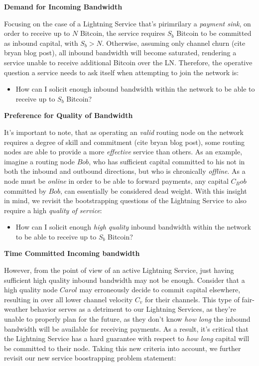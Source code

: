 \documentclass[12pt,a4paper]{article}
\theoremstyle{definition}
\begin{document}
\begin{center}
	\textbf{Demand for Incoming Bandwidth}
\end{center}

Focusing on the case of a Lightning Service that's pirimrilary a \emph{payment
sink}, on order to receive up to $N$ Bitcoin, the service requires $S_b$
Bitcoin to be committed as inbound capital, with $S_b > N$. Otherwise, assuming
only channel churn (cite bryan blog post), all inbound bandwidth will become
saturated, rendering a service unable to receive additional Bitcoin over the
LN. Therefore, the operative question a service needs to ask itself when
attempting to join the network is:

\begin{itemize}
        \item How can I solicit enough inbound bandwidth within the network to
            be able to receive up to $S_b$ Bitcoin?
\end{itemize}


\begin{center}
	\textbf{Preference for Quality of Bandwidth}
\end{center}

It's important to note, that as operating an \emph{valid} routing node on the
network requires a degree of skill and commitment (cite bryan blog post), some
routing nodes are able to provide a more \emph{effective} service than others.
As an example, imagine a routing node $Bob$, who has sufficient capital
committed to his not in both the inbound and outbound directions, but who is
chronically \emph{offline}. As a node must be \emph{online} in order to be able
to forward payments, any capital $C_Bob$ committed by $Bob$, can essentially be
considered dead weight. With this insight in mind, we revisit the bootstrapping
questions of the Lightning Service to also require a high \emph{quality of
service}:

\begin{itemize}
        \item How can I solicit enough \emph{high quality} inbound bandwidth
            within the network to be able to receive up to $S_b$ Bitcoin?
\end{itemize}

\begin{center}
	\textbf{Time Committed Incoming bandwidth}
\end{center}


However, from the point of view of an active Lightning Service, just having
sufficient high quality inbound bandwidth may not be enough. Consider that a
high quality node $Carol$ may erroneously decide to commit capital elsewhere,
resulting in over all lower channel velocity $C_v$ for their channels. This
type of fair-weather behavior serves as a detriment to our Lightning Services,
as they're unable to properly plan for the future, as they don't know \emph{how
long} the inbound bandwidth will be available for receiving payments. As a
result, it's critical that the Lightning Service has a hard guarantee with
respect to \emph{how long} capital will be committed to their node. Taking this
new criteria into account, we further revisit our new service boostrapping
problem statement:
\end{document}
